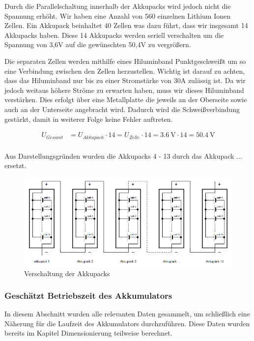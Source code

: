 Durch die Parallelschaltung innerhalb der Akkupacks wird jedoch nicht die Spannung erhöht. Wir haben eine Anzahl von 560 einzelnen Lithium Ionen Zellen. Ein Akkupack beinhaltet 40 Zellen was dazu führt, dass wir insgesamt 14 Akkupacks haben. Diese 14 Akkupacks werden seriell verschalten um die Spannung von 3,6V auf die gewünschten 50,4V zu vergrößern.

Die separaten Zellen werden mithilfe eines Hiluminband Punktgeschweißt um so eine Verbindung zwischen den Zellen herzustellen.
Wichtig ist darauf zu achten, dass das Hiluminband nur bis zu einer Stromstärke von 30A zulässig ist. Da wir jedoch weitaus höhere Ströme zu erwarten haben, muss wir dieses Hiluminband verstärken. Dies erfolgt über eine Metallplatte die jeweils an der Oberseite sowie auch an der Unterseite angebracht wird. Dadurch wird die Schweißverbindung gestärkt, damit in weiterer Folge keine Fehler auftreten. 

\begin{align*}
U_{Gesamt} &= U_{Akkupack} \cdot 14= U_{Zelle} \cdot 14= 3.6~\mathrm{V} \cdot 14 = 50.4~\mathrm{V}\\
\end{align*}

Aus Darstellungsgründen wurden die Akkupacks 4 - 13 durch das  Akkupack ... ersetzt.

\begin{figure}[H]
	\begin{center}
		\includegraphics[scale=0.9]{figures/Akku/VerschaltungderAkkupacks.PNG}
		\caption{Verschaltung der Akkupacks}
		\label{Verschaltung der Akkupacks}
	\end{center}
\end{figure}
\newpage
\subsubsection{Geschätzt Betriebszeit des Akkumulators}

In diesem Abschnitt wurden alle relevanten Daten gesammelt, um schließlich eine Näherung für die Laufzeit des Akkumulators durchzuführen. Diese Daten wurden bereits im Kapitel Dimensionierung teilweise berechnet.

